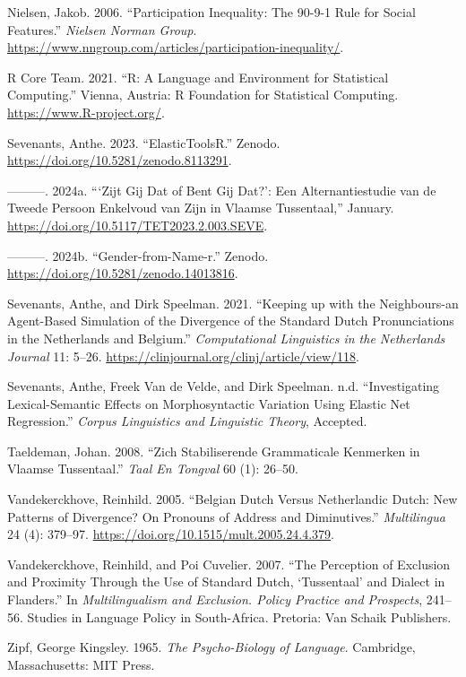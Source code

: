\documentclass[
  letterpaper,
  DIV=11,
  numbers=noendperiod,
  oneside]{scrartcl}
\newlength{\cslhangindent}
\newenvironment{CSLReferences}[2] %
 {\begin{list}{}{%
  \setlength{\itemindent}{0pt}
  \setlength{\leftmargin}{0pt}
  \setlength{\parsep}{0pt}
  \ifodd #1
   \setlength{\leftmargin}{\cslhangindent}
   \setlength{\itemindent}{-1\cslhangindent}
  \fi
  \setlength{\itemsep}{#2\baselineskip}}}
 {\end{list}}
\begin{document}
\begin{CSLReferences}{1}{0}
Nielsen, Jakob. 2006. {``Participation {Inequality}: {The} 90-9-1 {Rule}
for {Social} {Features}.''} \emph{Nielsen Norman Group}.
\url{https://www.nngroup.com/articles/participation-inequality/}.

R Core Team. 2021. {``R: A Language and Environment for Statistical
Computing.''} Vienna, Austria: R Foundation for Statistical Computing.
\url{https://www.R-project.org/}.

Sevenants, Anthe. 2023. {``ElasticToolsR.''} Zenodo.
\url{https://doi.org/10.5281/zenodo.8113291}.

---------. 2024a. {``{`{Zijt} Gij Dat of Bent Gij Dat?'}: {Een}
Alternantiestudie van de Tweede Persoon Enkelvoud van Zijn in {Vlaamse}
Tussentaal,''} January.
\url{https://doi.org/10.5117/TET2023.2.003.SEVE}.

---------. 2024b. {``Gender-from-Name-r.''} Zenodo.
\url{https://doi.org/10.5281/zenodo.14013816}.

Sevenants, Anthe, and Dirk Speelman. 2021. {``Keeping up with the
Neighbours-an Agent-Based Simulation of the Divergence of the Standard
Dutch Pronunciations in the Netherlands and Belgium.''}
\emph{Computational Linguistics in the Netherlands Journal} 11: 5--26.
\url{https://clinjournal.org/clinj/article/view/118}.

Sevenants, Anthe, Freek Van de Velde, and Dirk Speelman. n.d.
{``Investigating Lexical-Semantic Effects on Morphosyntactic Variation
Using Elastic Net Regression.''} \emph{Corpus Linguistics and Linguistic
Theory}, Accepted.

Taeldeman, Johan. 2008. {``Zich Stabiliserende Grammaticale Kenmerken in
{Vlaamse} Tussentaal.''} \emph{Taal En Tongval} 60 (1): 26--50.

Vandekerckhove, Reinhild. 2005. {``Belgian Dutch Versus Netherlandic
Dutch: New Patterns of Divergence? On Pronouns of Address and
Diminutives.''} \emph{Multilingua} 24 (4): 379--97.
\url{https://doi.org/10.1515/mult.2005.24.4.379}.

Vandekerckhove, Reinhild, and Poi Cuvelier. 2007. {``The Perception of
Exclusion and Proximity Through the Use of {Standard} {Dutch},
{`Tussentaal'} and Dialect in {Flanders}.''} In \emph{Multilingualism
and Exclusion. {Policy} Practice and Prospects}, 241--56. Studies in
{Language} {Policy} in {South}-{Africa}. Pretoria: Van Schaik
Publishers.

Zipf, George Kingsley. 1965. \emph{The {Psycho}-{Biology} of
{Language}}. Cambridge, Massachusetts: MIT Press.

\end{CSLReferences}
\end{document}
